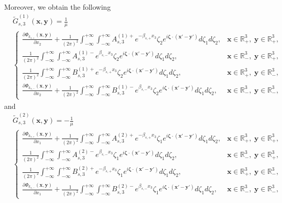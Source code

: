 \documentclass[final,reqno]{siamltex}
\newcommand{\pa}{\partial}
\newcommand{\wid}{\widetilde}
\newcommand{\mat}{\mathbb}
\newcommand{\R}{{\mat R}}
\begin{document}
Moreover, we obtain the following 
\begin{align*}
&\wid G_{s,3}^{(1)}(\mathbf{x},\mathbf{y})=\frac{1}{\mu} \\
&\left\{
\begin{array}{ll}
	\displaystyle\frac{\pa\Phi_{k_{s,+}}(\mathbf{x},\mathbf{y})}{\pa x_2}+\frac{1}{(2\pi)^2}\int_{-\infty}^{+\infty}\int_{-\infty}^{+\infty}A_{s,3}^{(1)+}e^{-\beta_{s,+}x_3}\zeta_2e^{i\boldsymbol{\zeta}\cdot(\mathbf{x}'-\mathbf{y}')}d\zeta_1d\zeta_2,&\mathbf{x}\in\R^3_+,\;\mathbf{y}\in\R^3_+,\\
	\displaystyle\frac{1}{(2\pi)^2}\int_{-\infty}^{+\infty}\int_{-\infty}^{+\infty}A_{s,3}^{(1)-}e^{\beta_{s,-}x_3}\zeta_2e^{i\boldsymbol{\zeta}\cdot(\mathbf{x}'-\mathbf{y}')}d\zeta_1d\zeta_2,&\mathbf{x}\in\R^3_-,\;\mathbf{y}\in\R^3_+, \\
	\displaystyle\frac{1}{(2\pi)^2}\int_{-\infty}^{+\infty}\int_{-\infty}^{+\infty}B_{s,3}^{(1)+}e^{-\beta_{s,+}x_3}\zeta_2e^{i\boldsymbol{\zeta}\cdot(\mathbf{x}'-\mathbf{y}')}d\zeta_1d\zeta_2,&\mathbf{x}\in\R^3_+,\;\mathbf{y}\in\R^3_-, \\
	\displaystyle\frac{\pa\Phi_{k_{s,-}}(\mathbf{x},\mathbf{y})}{\pa x_2}+\frac{1}{(2\pi)^2}\int_{-\infty}^{+\infty}\int_{-\infty}^{+\infty}B_{s,3}^{(1)-}e^{\beta_{s,-}x_3}\zeta_2e^{i\boldsymbol{\zeta}\cdot(\mathbf{x}'-\mathbf{y}')}d\zeta_1d\zeta_2,&\mathbf{x}\in\R^3_-,\;\mathbf{y}\in\R^3_-, 
\end{array}
\right.
\end{align*}
and 
\begin{align*}
&\wid G_{s,3}^{(2)}(\mathbf{x},\mathbf{y})=-\frac{1}{\mu} \\
&\left\{
\begin{array}{ll}
	\displaystyle\frac{\pa\Phi_{k_{s,+}}(\mathbf{x},\mathbf{y})}{\pa x_1}+\frac{1}{(2\pi)^2}\int_{-\infty}^{+\infty}\int_{-\infty}^{+\infty}A_{s,3}^{(2)+}e^{-\beta_{s,+}x_3}\zeta_1e^{i\boldsymbol{\zeta}\cdot(\mathbf{x}'-\mathbf{y}')}d\zeta_1d\zeta_2,&\mathbf{x}\in\R^3_+,\;\mathbf{y}\in\R^3_+,\\
	\displaystyle\frac{1}{(2\pi)^2}\int_{-\infty}^{+\infty}\int_{-\infty}^{+\infty}A_{s,3}^{(2)-}e^{\beta_{s,-}x_3}\zeta_1e^{i\boldsymbol{\zeta}\cdot(\mathbf{x}'-\mathbf{y}')}d\zeta_1d\zeta_2,&\mathbf{x}\in\R^3_-,\;\mathbf{y}\in\R^3_+, \\
	\displaystyle\frac{1}{(2\pi)^2}\int_{-\infty}^{+\infty}\int_{-\infty}^{+\infty}B_{s,3}^{(2)+}e^{-\beta_{s,+}x_3}\zeta_1e^{i\boldsymbol{\zeta}\cdot(\mathbf{x}'-\mathbf{y}')}d\zeta_1d\zeta_2,&\mathbf{x}\in\R^3_+,\;\mathbf{y}\in\R^3_-, \\
	\displaystyle\frac{\pa\Phi_{k_{s,-}}(\mathbf{x},\mathbf{y})}{\pa x_1}+\frac{1}{(2\pi)^2}\int_{-\infty}^{+\infty}\int_{-\infty}^{+\infty}B_{s,3}^{(2)-}e^{\beta_{s,-}x_3}\zeta_1e^{i\boldsymbol{\zeta}\cdot(\mathbf{x}'-\mathbf{y}')}d\zeta_1d\zeta_2,&\mathbf{x}\in\R^3_-,\;\mathbf{y}\in\R^3_-, 
\end{array}
\right.
\end{align*}
\end{document}
